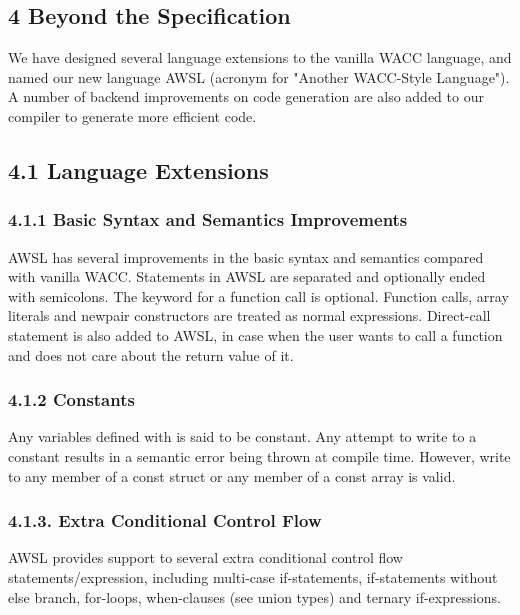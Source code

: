 \documentclass[10pt,a4paper]{report}
\begin{document}
  \subsection*{4 Beyond the Specification}
  We have designed several language extensions to the vanilla WACC language, and named our new language AWSL (acronym for "Another WACC-Style Language").
  A number of backend improvements on code generation are also added to our compiler to generate more efficient code.
  \subsection*{4.1 Language Extensions}

  \subsubsection*{4.1.1 Basic Syntax and Semantics Improvements}
  AWSL has several improvements in the basic syntax and semantics compared with vanilla WACC. Statements in AWSL are separated and optionally
  ended with semicolons. The  keyword for a function call is optional. Function calls, array literals and newpair constructors 
  are treated as normal expressions. Direct-call statement is also added to AWSL, in case when the user wants to call a function and does not
  care about the return value of it.

  \subsubsection*{4.1.2 Constants}
  Any variables defined with  is said to be constant. Any attempt to write to a constant results in a semantic error being thrown at compile time.
  However, write to any member of a const struct or any member of a const array is valid. 

  \subsubsection*{4.1.3. Extra Conditional Control Flow}
  AWSL provides support to several extra conditional control flow statements/expression, including multi-case if-statements, if-statements
  without else branch, for-loops, when-clauses (see union types) and ternary if-expressions. 
\end{document}
